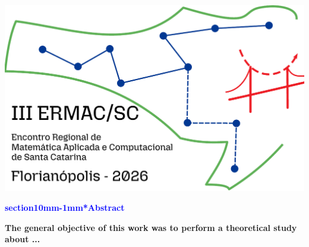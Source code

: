 \documentclass[a0,portrait]{a0poster}
\makeatletter
\renewcommand{\LARGE}{\fontsize{50}{70}\selectfont\bfseries} %
\renewcommand{\large}{\fontsize{40}{50}\selectfont\bfseries}
\renewcommand{\section}{\@startsection%
  {section}{1}{0mm}{-\baselineskip}{1mm}{\LARGE\color{myred}\bfseries}}
\makeatother
\begin{document}
\begin{center}
{\begin{center}
\includegraphics[scale=0.9]{ermac-logo-texto.pdf}
\end{center}}
\parbox{0.9\textwidth}{
\begin{center}
\large
 \textcolor{blue}{\section*{Abstract}}
 \end{center}
  \large
The general objective of this work was to perform a theoretical study about ...}
\end{center}
\vspace{2cm}
\end{document}
